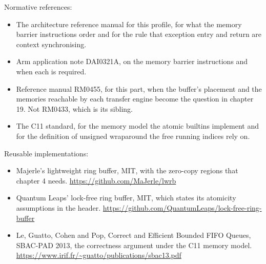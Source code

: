 Normative references:
\begin{itemize}
\item The architecture reference manual for this profile, for what the memory
barrier instructions order and for the rule that exception entry and return are
context synchronising.
\item Arm application note DAI0321A, on the memory barrier instructions and when
each is required.
\item Reference manual RM0455, for this part, when the buffer's placement and
the memories reachable by each transfer engine become the question in chapter
19. Not RM0433, which is its sibling.
\item The C11 standard, for the memory model the atomic builtins implement and
for the definition of unsigned wraparound the free running indices rely on.
\end{itemize}

Reusable implementations:
\begin{itemize}
\item Majerle's lightweight ring buffer, MIT, with the zero-copy regions that
chapter 4 needs.\newline
\url{https://github.com/MaJerle/lwrb}
\item Quantum Leaps' lock-free ring buffer, MIT, which states its atomicity
assumptions in the header.\newline
\url{https://github.com/QuantumLeaps/lock-free-ring-buffer}
\item Le, Guatto, Cohen and Pop, Correct and Efficient Bounded FIFO Queues,
SBAC-PAD 2013, the correctness argument under the C11 memory model.\newline
\url{https://www.irif.fr/~guatto/publications/sbac13.pdf}
\end{itemize}
